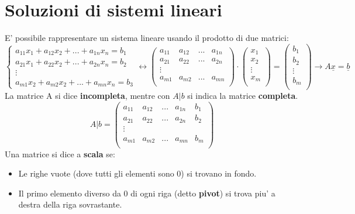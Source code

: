 \documentclass{report}
\begin{document}
\section{Soluzioni di sistemi lineari}
E' possibile rappresentare un sistema lineare usando il prodotto di due matrici:
\[
  \begin{cases}
    a_{11}x_1 + a_{12}x_2 + ... + a_{1n}x_n = b_1\\
    a_{21}x_1 + a_{22}x_2 + ... + a_{2n}x_n = b_2\\
    \vdots\\
    a_{m1}x_2 + a_{m2}x_2 + ... + a_{mn}x_n= b_3
  \end{cases} \leftrightarrow \begin{pmatrix}
  a_{11} & a_{12} & ... & a_{1n}\\
  a_{21} & a_{22} & ... & a_{2n}\\
  \vdots\\
  a_{m1} & a_{m2} & ... & a_{mn}\\
  \end{pmatrix} \cdot 
  \begin{pmatrix}
  x_1\\
  x_2\\
  \vdots\\
  x_m\\
  \end{pmatrix} = 
  \begin{pmatrix}
  b_1\\
  b_2\\
  \vdots \\
  b_m \\
  \end{pmatrix} \to A\underline{x}=\underline{b}
\]
La matrice A si dice \textbf{incompleta}, mentre con $A|b$ si indica la matrice \textbf{completa}.
\[
A|b = 
\begin{pmatrix}
a_{11} & a_{12} & ... & a_{1n} & b_1\\
a_{21} & a_{22} & ... & a_{2n} & b_2\\
 \vdots\\
a_{m1} & a_{m2} & ... & a_{mn} & b_m\\
\end{pmatrix}
\]
Una matrice si dice a \textbf{scala} se:
\begin{itemize}
  \item Le righe vuote (dove tutti gli elementi sono 0) si trovano in fondo.
  \item Il primo elemento diverso da 0 di ogni riga (detto \textbf{pivot}) si trova piu' a destra della riga sovrastante.
\end{itemize}
\end{document}

